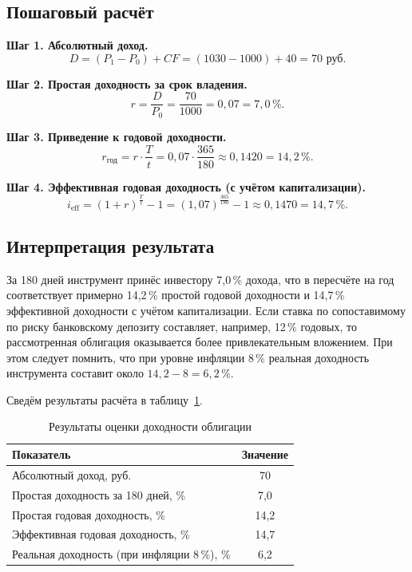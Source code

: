 \documentclass[14pt, a4paper]{extarticle}
\begin{document}
\subsection{Пошаговый расчёт}

\textbf{Шаг 1. Абсолютный доход.}
\begin{equation*}
  D = (P_1 - P_0) + CF = (1030 - 1000) + 40 = 70 \text{ руб.}
\end{equation*}

\textbf{Шаг 2. Простая доходность за срок владения.}
\begin{equation*}
  r = \frac{D}{P_0} = \frac{70}{1000} = 0{,}07 = 7{,}0\,\%.
\end{equation*}

\textbf{Шаг 3. Приведение к годовой доходности.}
\begin{equation*}
  r_{\text{год}} = r \cdot \frac{T}{t}
  = 0{,}07 \cdot \frac{365}{180} \approx 0{,}1420 = 14{,}2\,\%.
\end{equation*}

\textbf{Шаг 4. Эффективная годовая доходность (с учётом капитализации).}
\begin{equation*}
  i_{\text{eff}} = (1 + r)^{\frac{T}{t}} - 1
  = (1{,}07)^{\frac{365}{180}} - 1 \approx 0{,}1470 = 14{,}7\,\%.
\end{equation*}

\subsection{Интерпретация результата}

За 180 дней инструмент принёс инвестору 7,0\,\% дохода, что в пересчёте на
год соответствует примерно 14,2\,\% простой годовой доходности и 14,7\,\%
эффективной доходности с учётом капитализации. Если ставка по сопоставимому по
риску банковскому депозиту составляет, например, 12\,\% годовых, то
рассмотренная облигация оказывается более привлекательным вложением. При этом
следует помнить, что при уровне инфляции 8\,\% реальная доходность инструмента
составит около $14{,}2 - 8 = 6{,}2\,\%$.

Сведём результаты расчёта в таблицу~\ref{tab:calc}.

\begin{table}[h]
  \centering
  \caption{Результаты оценки доходности облигации}
  \label{tab:calc}
  \begin{tabular}{lc}
    \toprule
    \textbf{Показатель} & \textbf{Значение} \\
    \midrule
    Абсолютный доход, руб. & 70 \\
    Простая доходность за 180 дней, \% & 7{,}0 \\
    Простая годовая доходность, \% & 14{,}2 \\
    Эффективная годовая доходность, \% & 14{,}7 \\
    Реальная доходность (при инфляции 8\,\%), \% & 6{,}2 \\
    \bottomrule
  \end{tabular}
\end{table}
\end{document}

